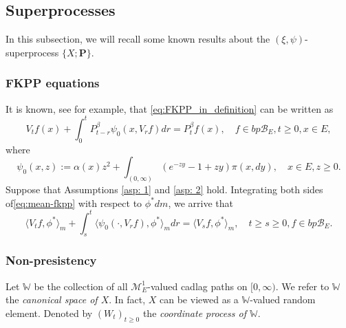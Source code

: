\documentclass[12pt, a4paper]{amsart}
\theoremstyle{definition}
\numberwithin{equation}{section}
\begin{document}
\subsection{Superprocesses}
\label{sec: Superprocesses}
	In this subsection, we will recall some known results about the $(\xi, \psi)$-superprocess $\{X; \mathbf P\}$.
\subsubsection{FKPP equations}
	It is known, see \cite[Theorem 2.23]{Li2011Measure-valued} for example, that \eqref{eq:FKPP_in_definition} can be written as
\[\label{eq:mean-fkpp}
	V_t f(x) + \int_0^t P^\beta_{t-r} \psi_0(x,V_r f) dr
	= P^\beta_t f(x),
	\quad f \in bp\mathscr B_E, t \geq 0,x \in E,
\]
	where
\[
	\psi_0(x,z)
	:= \alpha(x) z^2 + \int_{(0,\infty)} (e^{-z y} - 1 + z y) \pi(x,dy),
	\quad x \in E,z \geq 0.
\]
    Suppose that Assumptions \ref{asp: 1} and \ref{asp: 2} hold. 
Integrating both sides of\eqref{eq:mean-fkpp}  with respect to  $\phi^*dm$, we arrive that
	\[\label{eq:langleVtfphiranglem_equation}
	 \langle V_tf,\phi^*\rangle_m + \int_s^t \langle \psi_0(\cdot ,V_r f) , \phi^*\rangle_mdr
	= \langle V_sf,\phi^*\rangle_m,
	\quad t\geq s\geq 0, f\in bp\mathscr B_E.
	\]

\subsubsection{Non-presistency}
	Let $\mathbb W$ be the collection of all $\mathcal M^1_E$-valued cadlag paths on $[0,\infty)$.
	We refer to $\mathbb W$ the \emph{canonical space of $X$}.
	In fact, $X$ can be viewed as a $\mathbb W$-valued random element.
	Denoted by $(W_t)_{t\geq 0}$ the \emph{coordinate process of $\mathbb W$}.
\end{document}
